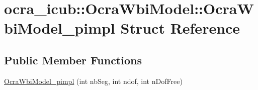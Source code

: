\hypertarget{structOcraWbiModel_1_1OcraWbiModel__pimpl}{\section{ocra\-\_\-icub\-:\-:\-Ocra\-Wbi\-Model\-:\-:\-Ocra\-Wbi\-Model\-\_\-pimpl \-Struct \-Reference}
\label{structOcraWbiModel_1_1OcraWbiModel__pimpl}
}
\subsection*{\-Public \-Member \-Functions}
\begin{DoxyCompactItemize}
\item 
\hyperlink{structOcraWbiModel_1_1OcraWbiModel__pimpl_a160077c75e80a7d0fcc8b2491de7f86c}{\-Ocra\-Wbi\-Model\-\_\-pimpl} (int nb\-Seg, int ndof, int n\-Dof\-Free)
\end{DoxyCompactItemize}
